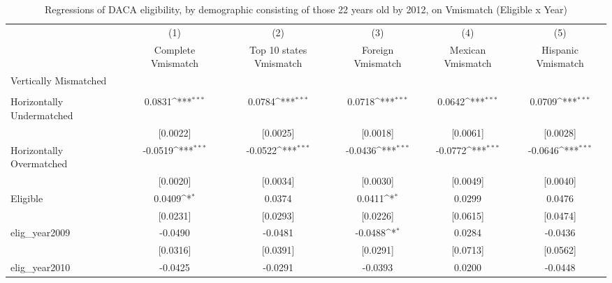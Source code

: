 \begin{table}[htbp]\centering
\def\sym#1{\ifmmode^{#1}\else\(^{#1}\)\fi}
\caption{Regressions of DACA eligibility, by demographic consisting of those 22 years old by 2012, on Vmismatch (Eligible x Year)}
\begin{tabular}{l*{5}{c}}
\toprule
                    &\multicolumn{1}{c}{(1)}         &\multicolumn{1}{c}{(2)}         &\multicolumn{1}{c}{(3)}         &\multicolumn{1}{c}{(4)}         &\multicolumn{1}{c}{(5)}         \\
                    &Complete Vmismatch         &Top 10 states Vmismatch         &Foreign Vmismatch         &Mexican Vmismatch         &Hispanic Vmismatch         \\
\midrule
Vertically Mismatched&                     &                     &                     &                     &                     \\
                    &                     &                     &                     &                     &                     \\
\addlinespace
Horizontally Undermatched&      0.0831\sym{***}&      0.0784\sym{***}&      0.0718\sym{***}&      0.0642\sym{***}&      0.0709\sym{***}\\
                    &    [0.0022]         &    [0.0025]         &    [0.0018]         &    [0.0061]         &    [0.0028]         \\
\addlinespace
Horizontally Overmatched&     -0.0519\sym{***}&     -0.0522\sym{***}&     -0.0436\sym{***}&     -0.0772\sym{***}&     -0.0646\sym{***}\\
                    &    [0.0020]         &    [0.0034]         &    [0.0030]         &    [0.0049]         &    [0.0040]         \\
\addlinespace
Eligible            &      0.0409\sym{*}  &      0.0374         &      0.0411\sym{*}  &      0.0299         &      0.0476         \\
                    &    [0.0231]         &    [0.0293]         &    [0.0226]         &    [0.0615]         &    [0.0474]         \\
\addlinespace
elig\_year2009       &     -0.0490         &     -0.0481         &     -0.0488\sym{*}  &      0.0284         &     -0.0436         \\
                    &    [0.0316]         &    [0.0391]         &    [0.0291]         &    [0.0713]         &    [0.0562]         \\
\addlinespace
elig\_year2010       &     -0.0425         &     -0.0291         &     -0.0393         &      0.0200         &     -0.0448         \\

\end{tabular}
\end{table}
